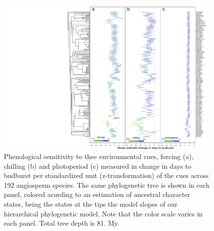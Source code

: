 \documentclass{article}\usepackage[]{graphicx}\usepackage[]{color}
\begin{document}
\begin{figure} [H]
  \begin{center}
  \includegraphics[width=16cm]{..//..//analyses/phylogeny/figures/muplot_phylo_allcue_angio2.pdf}
  \caption{Phenological sensitivity to thee environmental cues, forcing (a), chilling (b) and photoperiod (c) measured in change in days to budburst per standardized unit (z-transformation) of the cues across 192 angiosperm species. The same phylogenetic tree is shown in each panel, colored acording to an estimation of ancestral character states, being the states at the tips the model slopes of our hierarchical phylogenetic model. Note that the color scale varies in each panel. Total tree depth is 81. My.}
  \label{fig:muplot_all}
  \end{center}
\end{figure}
\end{document}
